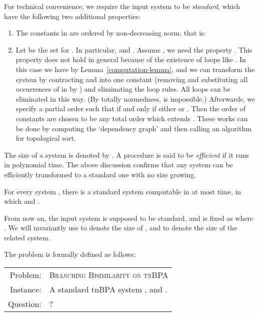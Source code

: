 \documentclass{llncs}
\begin{document}
For technical convenience, we require the input  system  to be {\em standard}, which have the following two additional properties:
\begin{enumerate}
\item
The constants in  are ordered by non-decreasing norm, that is:


\item
 Let  be the set  for . In particular,  and . Assume , we need the property .   This property does not hold in general because of the existence of loops like .  In this case we have  by Lemma~\ref{computation-lemma}, and we can transform the system by contracting  and  into one constant (removing  and substituting all occurrences of  in  by ) and eliminating the loop rules.   All loops can be eliminated in this way.  (By totally normedness,  is impossible.)  Afterwards, we specify a partial order  such that  if and only if either  or . Then the order of constants are chosen to be any total order which extends . These works can be done by computing the `dependency graph' and then calling an algorithm for topological sort.
\end{enumerate}

The size of a  system  is denoted by . A procedure is said to be {\em efficient} if it runs in polynomial time.  The above discussion confirms that any  system can be efficiently transformed to a standard one with no size growing.

\begin{lemma}\label{lem:normal_two}
For every  system , there is a standard  system  computable in at most  time, in which  and .
\end{lemma}
From now on, the input  system is supposed to be standard, and is fixed as  where .  We will invariantly use  to denote the size of , and  to denote the size of the related  system.

The problem is formally defined as follows:
\begin {center}\small
 \begin{tabular}{|rp{9.5cm}|}\hline
        Problem:   \quad  &  \textsc{Branching Bisimilarity on tnBPA} \\
        Instance:  \quad  &  A standard tnBPA system , and .  \\
        Question:  \quad  &  ? \\  \hline
    \end{tabular}
\end {center}
\end{document}
